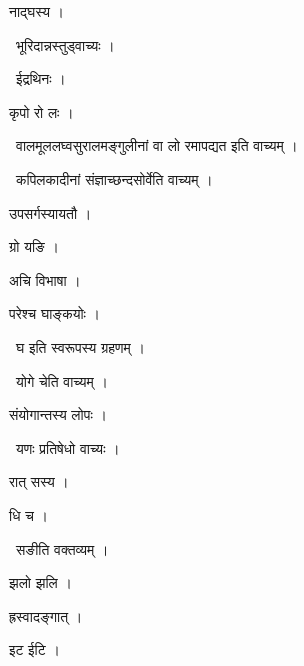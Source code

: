 \documentclass[10pt, openany, oneside]{book}
\begin{document}
\noindent नाद्घस्य ।

\par\noindent\hspace{1.5em}{\vps वा॰}~{\qt भूरिदान्नस्तुड्वाच्यः ।}

\par\noindent\hspace{1.5em}{\vps वा॰}~{\qt ईद्रथिनः ।}

\noindent कृपो रो लः ।

\par\noindent\hspace{1.5em}{\vps वा॰}~{\qt वालमूललघ्वसुरालमङ्गुलीनां वा लो रमापद्यत इति वाच्यम् ।}

\par\noindent\hspace{1.5em}{\vps वा॰}~{\qt कपिलकादीनां संज्ञाच्छन्दसोर्वेति वाच्यम् ।}

\noindent उपसर्गस्यायतौ ।

\noindent ग्रो यङि ।

\noindent अचि विभाषा ।

\noindent परेश्च घाङ्कयोः ।

\par\noindent\hspace{1.5em}{\vps वा॰}~{\qt घ इति स्वरूपस्य ग्रहणम् ।}

\par\noindent\hspace{1.5em}{\vps वा॰}~{\qt योगे चेति वाच्यम् ।}

\noindent संयोगान्तस्य लोपः ।

\par\noindent\hspace{1.5em}{\vps वा॰}~{\qt यणः प्रतिषेधो वाच्यः ।}

\noindent रात् सस्य ।

\noindent धि च ।

\par\noindent\hspace{1.5em}{\vps वा॰}~{\qt सङीति वक्तव्यम् ।}

\noindent झलो झलि ।

\noindent ह्रस्वादङ्गात् ।

\noindent इट ईटि ।
\end{document}
